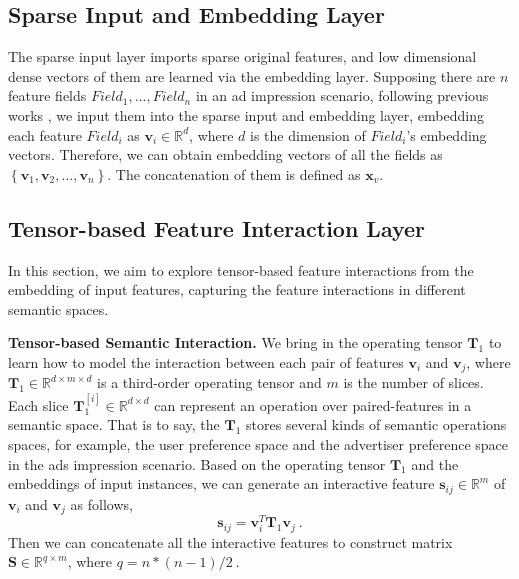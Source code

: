 \documentclass[sigconf]{acmart}
\begin{document}
\subsection{Sparse Input and Embedding Layer}
The sparse input layer imports sparse original features, and low dimensional dense vectors of them are learned via the embedding layer. Supposing there are $n$ feature fields $Field_1,...,Field_n$ in an ad impression scenario, following previous works \cite{li2019fignn}, we input them into the sparse input and embedding layer, embedding each feature $Field_i$ as $\mathbf{v}_{i}\in \mathbb{R} ^{d}$, where ${d}$ is the dimension of $Field_i$'s embedding vectors. Therefore, we can obtain embedding vectors of all the fields as $\left\{ \mathbf{v}_1, \mathbf{v}_2, ..., \mathbf{v}_n\right\}$. The concatenation of them is defined as $\mathbf{x}_v$.


\subsection{Tensor-based Feature Interaction Layer} In this section, we aim to explore tensor-based feature interactions from the embedding of input features, capturing the feature interactions in different semantic spaces. 


\textbf{Tensor-based Semantic Interaction.} We bring in the operating tensor $\mathbf{T}_1$ to learn how to model the interaction between each pair of features $\mathbf{v}_i$ and $\mathbf{v}_j$, where $\mathbf{T}_1\in \mathbb{R} ^{d\times m\times d}$ is a third-order operating tensor and $m$ is the number of slices. Each slice $\mathbf{T}_1^{[i]}\in \mathbb{R} ^{d\times d}$ can represent an operation over paired-features in a semantic space. That is to say, the $\mathbf{T}_1$ stores several kinds of semantic operations spaces, for example, the user preference space and the advertiser preference space in the ads impression scenario. Based on the operating tensor $\mathbf{T}_1$ and the embeddings of input instances, we can generate an interactive feature $\mathbf{s}_{ij}\in \mathbb{R} ^{m}$ of $\mathbf{v}_i$ and $\mathbf{v}_j$ as follows,
\begin{equation}
\mathbf{s}_{ij} = \mathbf{v}_i^T{\mathbf{T}_1}\mathbf{v}_j~.
\label{equ:combination}
\end{equation}
Then we can concatenate all the interactive features to construct matrix $\mathbf{S}\in \mathbb{R} ^{q\times m}$, where $q=n*(n-1)/2~$. 
\end{document}
